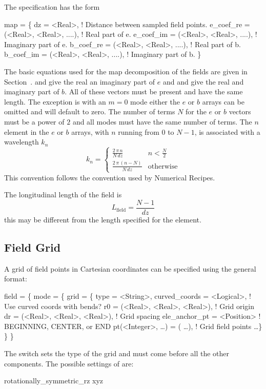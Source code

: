 The  specification has the form
\begin{example}
  map = \{
    dz        = <Real>,    ! Distance between sampled field points.
    e_coef_re = (<Real>, <Real>, ....),  ! Real part of e.
    e_coef_im = (<Real>, <Real>, ....),  ! Imaginary part of e.
    b_coef_re = (<Real>, <Real>, ....),  ! Real part of b.
    b_coef_im = (<Real>, <Real>, ....),  ! Imaginary part of b.
  \}
\end{example}
The basic equations used for the map decomposition of
the fields are given in Section~. 
 and  give the real an imaginary part of $e$ and
 and  give the real and imaginary part of $b$. All
of these vectors must be present and have the same length. The
exception is with an $m = 0$ mode either the $e$ or $b$ arrays can be
omitted and will default to zero. The number of terms $N$ for the $e$
or $b$ vectors must be a power of $2$ and all modes must have the same
number of terms. The $n$\Th element in the $e$ or $b$ arrays, with $n$
running from 0 to $N-1$, is associated with a wavelength $k_n$
\begin{equation}
  k_n = \begin{cases}
    \frac{2 \, \pi \, n}{N \, dz} & n < \frac{N}{2} \\
    \frac{2 \, \pi \, (n-N)}{N \, dz} & \text{otherwise}
  \end{cases}
\end{equation}
This convention follows the convention used by Numerical
Recipes\cite{b:nr}.  

The longitudinal length of the field is
\begin{equation}
  L_{\text{field}} = \frac{N - 1}{dz}
\end{equation}
this may be different from the length  specified for the
element.

\subsection {Field Grid}
\label{s:grid}

A grid of field points in Cartesian coordinates can be specified using the general format:
\begin{example}
  field = \{
    mode = \{
      grid = \{ 
        type = <String>,
        curved_coords = <Logical>,        ! Use curved coords with bends?
        r0   = (<Real>, <Real>, <Real>),  ! Grid origin 
        dr   = (<Real>, <Real>, <Real>),  ! Grid spacing
        ele_anchor_pt = <Position>        ! BEGINNING, CENTER, or END
        pt(<Integer>, \dots) = ( \ldots ),  ! Grid field points
        \ldots \} \} \}
\end{example}
The  switch sets the type of the grid and must come before
all the other components. The possible settings of  are:
\begin{example} 
  rotationally_symmetric_rz
  xyz
\end{example}

